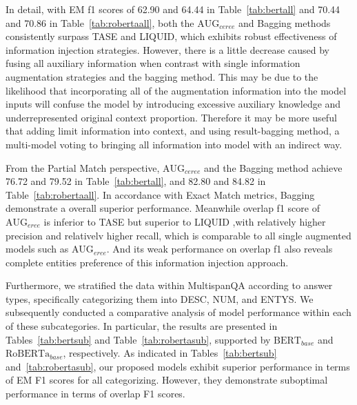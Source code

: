 In detail, with EM f1 scores of 62.90 and 64.44 in Table~\ref{tab:bertall} and 70.44 and 70.86 in Table~\ref{tab:robertaall}, both the $\text{AUG}_{ceree}$ and Bagging methods consistently surpass TASE and LIQUID, which exhibits robust effectiveness of information injection strategies. However, there is a little decrease caused by fusing all auxiliary information when contrast with single information augmentation strategies and the bagging method. This may be due to the likelihood that incorporating all of the augmentation information into the model inputs will confuse the model by introducing excessive auxiliary knowledge and underrepresented original context proportion. Therefore it may be more useful that adding limit information into context, and using result-bagging method, a multi-model voting to bringing all information into model with an indirect way.

From the Partial Match perspective, $\text{AUG}_{ceree}$ and the Bagging method achieve 76.72 and 79.52 in Table~\ref{tab:bertall}, and 82.80 and 84.82 in Table~\ref{tab:robertaall}. In accordance with Exact Match metrics, Bagging demonstrate a overall superior performance. Meanwhile overlap f1 score of $\text{AUG}_{eree}$ is inferior to TASE but superior to LIQUID ,with relatively higher precision and relativelv higher recall, which  is comparable to all single augmented models such as $\text{AUG}_{eree}$. And its weak performance on overlap f1 also reveals complete entities preference of this information injection approach.

Furthermore, we stratified the data within MultispanQA according to answer types, specifically categorizing them into DESC, NUM, and ENTYS. We subsequently conducted a comparative analysis of model performance within each of these subcategories. In particular, the results are presented in Tables~\ref{tab:bertsub} and Table~\ref{tab:robertasub}, supported by $\text{BERT}_{base}$ and $\text{RoBERTa}_{base}$, respectively.
As indicated in Tables~\ref{tab:bertsub} and~\ref{tab:robertasub}, our proposed models exhibit superior performance in terms of EM F1 scores for all categorizing. However, they demonstrate suboptimal performance in terms of overlap F1 scores.



